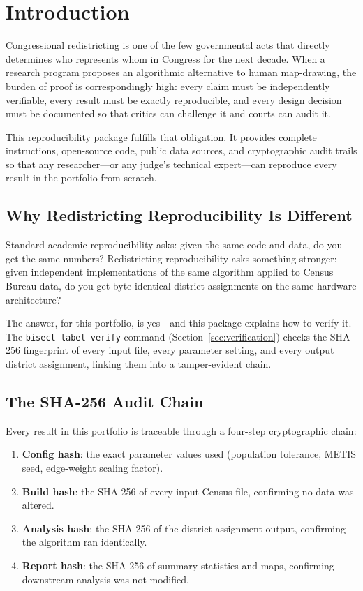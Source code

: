 
\section{Introduction}

Congressional redistricting is one of the few governmental acts that directly
determines who represents whom in Congress for the next decade.
When a research program proposes an algorithmic alternative to human map-drawing,
the burden of proof is correspondingly high: every claim must be independently
verifiable, every result must be exactly reproducible, and every design decision
must be documented so that critics can challenge it and courts can audit it.

This reproducibility package fulfills that obligation.
It provides complete instructions, open-source code, public data sources,
and cryptographic audit trails so that any researcher---or any judge's
technical expert---can reproduce every result in the portfolio from scratch.

\subsection*{Why Redistricting Reproducibility Is Different}

Standard academic reproducibility asks: given the same code and data,
do you get the same numbers?
Redistricting reproducibility asks something stronger: given independent
implementations of the same algorithm applied to Census Bureau data,
do you get byte-identical district assignments on the same hardware architecture?

The answer, for this portfolio, is yes---and this package explains how
to verify it.
The \texttt{bisect label-verify} command (Section~\ref{sec:verification})
checks the SHA-256 fingerprint of every input file, every parameter setting,
and every output district assignment, linking them into a tamper-evident chain.

\subsection*{The SHA-256 Audit Chain}

Every result in this portfolio is traceable through a four-step cryptographic chain:

\begin{enumerate}[leftmargin=*, itemsep=4pt]
  \item \textbf{Config hash}: the exact parameter values used
        (population tolerance, METIS seed, edge-weight scaling factor).
  \item \textbf{Build hash}: the SHA-256 of every input Census file,
        confirming no data was altered.
  \item \textbf{Analysis hash}: the SHA-256 of the district assignment output,
        confirming the algorithm ran identically.
  \item \textbf{Report hash}: the SHA-256 of summary statistics and maps,
        confirming downstream analysis was not modified.
\end{enumerate}

